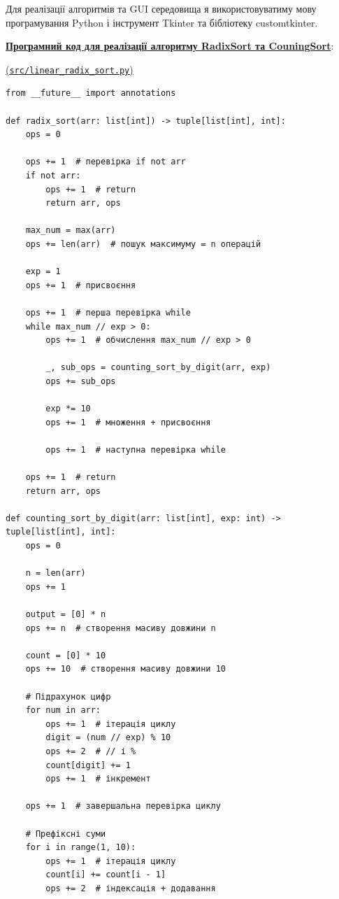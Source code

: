 \documentclass[12pt,a4paper]{article}
\begin{document}
    \noindent
    Для реалізації алгоритмів та GUI середовища я використовуватиму мову програмування Python і інструмент Tkinter та бібліотеку customtkinter.

    \vspace{1em}

    \noindent
    \textbf{\underline{Програмний код для реалізації алгоритму RadixSort та CouningSort}}:

    \underline{(\texttt{src/linear\_radix\_sort.py})}

    \begin{verbatim}
from __future__ import annotations

def radix_sort(arr: list[int]) -> tuple[list[int], int]:
    ops = 0

    ops += 1  # перевірка if not arr
    if not arr:
        ops += 1  # return
        return arr, ops

    max_num = max(arr)
    ops += len(arr)  # пошук максимуму = n операцій

    exp = 1
    ops += 1  # присвоєння

    ops += 1  # перша перевірка while
    while max_num // exp > 0:
        ops += 1  # обчислення max_num // exp > 0

        _, sub_ops = counting_sort_by_digit(arr, exp)
        ops += sub_ops

        exp *= 10
        ops += 1  # множення + присвоєння

        ops += 1  # наступна перевірка while

    ops += 1  # return
    return arr, ops

def counting_sort_by_digit(arr: list[int], exp: int) -> tuple[list[int], int]:
    ops = 0

    n = len(arr)
    ops += 1

    output = [0] * n
    ops += n  # створення масиву довжини n

    count = [0] * 10
    ops += 10  # створення масиву довжини 10

    # Підрахунок цифр
    for num in arr:
        ops += 1  # ітерація циклу
        digit = (num // exp) % 10
        ops += 2  # // і %
        count[digit] += 1
        ops += 1  # інкремент

    ops += 1  # завершальна перевірка циклу

    # Префіксні суми
    for i in range(1, 10):
        ops += 1  # ітерація циклу
        count[i] += count[i - 1]
        ops += 2  # індексація + додавання


\end{verbatim}
\end{document}
